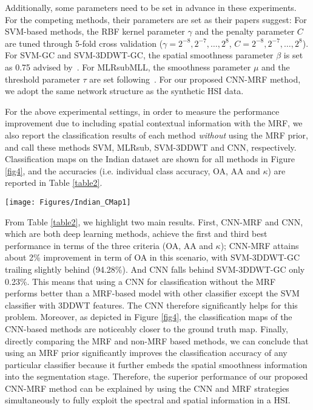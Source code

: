 \documentclass[journal]{IEEEtran}
\begin{document}
		
		Additionally, some parameters need to be set in advance in these experiments. For the competing methods, their parameters are set as their papers suggest: For SVM-based methods, the RBF kernel parameter $\gamma$ and the penalty parameter $C$ are tuned through 5-fold cross validation ($\gamma=2^{-8}, 2^{-7},\dots,2^{8}$, $C=2^{-8}, 2^{-7},\dots,2^{8}$). For SVM-GC and SVM-3DDWT-GC, the spatial smoothness parameter $\beta$ is set as 0.75 advised by~\cite{cao2017integration,tarabalka2014graph}. For MLRsubMLL, the smoothness parameter $\mu$ and the threshold parameter $\tau$ are set following~\cite{li2012spectral}. For our proposed CNN-MRF method, {{we adopt the same network structure as the synthetic HSI data.}}
		
		For the above experimental settings, in order to measure the performance improvement due to including spatial contextual information with the MRF, we also report the classification results of each method \textit{without} using the MRF prior, and call these methods SVM, MLRsub, {{SVM-3DDWT}} and CNN, respectively. Classification maps on the Indian dataset are shown for all methods in Figure \ref{fig4}, and the accuracies (i.e. individual class accuracy, OA, AA and $\kappa$) are reported in Table \ref{table2}. 
		
		
		\begin{figure*}
			\centering
			\texttt{[image: Figures/Indian\_CMap1]}
			\caption{{{Classification maps obtained by all methods on the Indian Pines dataset (overall accuracies are reported in parentheses).}}}\label{fig4}
		\end{figure*}
				
		From Table \ref{table2}, we highlight two main results. First, CNN-MRF and CNN, which are both deep learning methods, achieve the first and third best performance in terms of the three criteria (OA, AA and $\kappa$); CNN-MRF attains about 2\% improvement in term of OA in this scenario, with {{SVM-3DDWT-GC}} trailing slightly behind (94.28\%). {{And CNN falls behind SVM-3DDWT-GC only 0.23\%. This means that using a CNN for classification without the MRF performs better than a MRF-based model with other classifier except the SVM classifier with 3DDWT features.}} The CNN therefore significantly helps for this problem. Moreover, as depicted in Figure  \ref{fig4}, the classification maps of the CNN-based methods are noticeably closer to the ground truth map. Finally, directly comparing the MRF and non-MRF based methods, we can conclude that using an MRF prior significantly improves the classification accuracy of any particular classifier because it further embeds the spatial smoothness 
		information into the segmentation stage. Therefore, the superior performance of our proposed CNN-MRF method can be explained by using the CNN and MRF strategies simultaneously to fully exploit the spectral and spatial information in a HSI.
		
\end{document}
